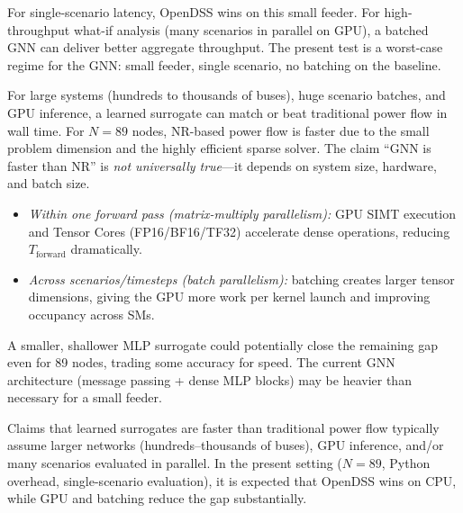 \documentclass[11pt]{article}
\begin{document}
\begin{description}[style=unboxed, leftmargin=0pt, labelwidth=0pt]
  \item[\textbf{Latency vs.\ throughput.}]
  For single-scenario latency, OpenDSS wins on this small feeder.  For high-throughput
  what-if analysis (many scenarios in parallel on GPU), a batched GNN can deliver
  better aggregate throughput.  The present test is a worst-case regime for the GNN:
  small feeder, single scenario, no batching on the baseline.

  \item[\textbf{When does a GNN outperform Newton--Raphson power flow?}]
  For large systems (hundreds to thousands of buses), huge scenario batches, and GPU
  inference, a learned surrogate can match or beat traditional power flow in wall time.
  For $N = 89$ nodes, NR-based power flow is faster due to the small problem dimension
  and the highly efficient sparse solver.  The claim ``GNN is faster than NR'' is
  \emph{not universally true}---it depends on system size, hardware, and batch size.

  \item[\textbf{Two levels of GPU parallelism.}]
  \begin{itemize}
    \item \emph{Within one forward pass (matrix-multiply parallelism):}
          GPU SIMT execution and Tensor Cores (FP16/BF16/TF32) accelerate dense
          operations, reducing $T_{\text{forward}}$ dramatically.
    \item \emph{Across scenarios/timesteps (batch parallelism):}
          batching creates larger tensor dimensions, giving the GPU more work per
          kernel launch and improving occupancy across SMs.
  \end{itemize}

  \item[\textbf{MLP vs.\ GNN trade-off.}]
  A smaller, shallower MLP surrogate could potentially close the remaining gap even for
  89 nodes, trading some accuracy for speed.  The current GNN architecture
  (message passing + dense MLP blocks) may be heavier than necessary for a small feeder.

  \item[\textbf{Consistency with the literature.}]
  Claims that learned surrogates are faster than traditional power flow typically assume
  larger networks (hundreds--thousands of buses), GPU inference, and/or many scenarios
  evaluated in parallel.  In the present setting
  ($N = 89$, Python overhead, single-scenario evaluation), it is expected that OpenDSS
  wins on CPU, while GPU and batching reduce the gap substantially.

\end{description}
\end{document}
